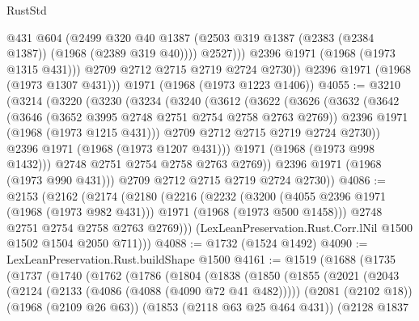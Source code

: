 \begin{lexlean}{RustStd}
\begin{coremodule}
{\begin{coremodule}
{{{{{                  @431
                  @604
                  (@2499
                    @320
                    @40
                    @1387
                    (@2503 @319 @1387 (@2383 (@2384 @1387)) (@1968 (@2389 @319 @40))))
                  @2527)))
            @2396
            @1971
            (@1968 (@1973 @1315 @431)))
          @2709
          @2712
          @2715
          @2719
          @2724
          @2730))
      @2396
      @1971
      (@1968 (@1973 @1307 @431)))
    @1971
    (@1968 (@1973 @1223 @1406))
@4055 := @3210
    (@3214
      (@3220
        (@3230
          (@3234
            (@3240
              (@3612
                (@3622
                  (@3626
                    (@3632
                      (@3642
                        (@3646 (@3652 @3995 @2748 @2751 @2754 @2758 @2763 @2769))
                        @2396
                        @1971
                        (@1968 (@1973 @1215 @431)))
                      @2709
                      @2712
                      @2715
                      @2719
                      @2724
                      @2730))
                  @2396
                  @1971
                  (@1968 (@1973 @1207 @431)))
                @1971
                (@1968 (@1973 @998 @1432)))
              @2748
              @2751
              @2754
              @2758
              @2763
              @2769))
          @2396
          @1971
          (@1968 (@1973 @990 @431)))
        @2709
        @2712
        @2715
        @2719
        @2724
        @2730))
@4086 := @2153
    (@2162
      (@2174
        (@2180
          (@2216
            (@2232
              (@3200 (@4055 @2396 @1971 (@1968 (@1973 @982 @431))) @1971 (@1968 (@1973 @500 @1458)))
              @2748
              @2751
              @2754
              @2758
              @2763
              @2769)))
        (LexLeanPreservation.Rust.Corr.lNil @1500 @1502 @1504 @2050 @711)))
@4088 := @1732 (@1524 @1492)
@4090 := LexLeanPreservation.Rust.buildShape @1500
@4161 := @1519
    (@1688
      (@1735
        (@1737
          (@1740
            (@1762
              (@1786
                (@1804
                  (@1838
                    (@1850
                      (@1855
                        (@2021
                          (@2043
                            (@2124 (@2133 (@4086 (@4088 (@4090 @72 @41 @482)))))
                            (@2081 (@2102 @18))
                            (@1968 (@2109 @26 @63))
                            (@1853 (@2118 @63 @25 @464 @431))
                            (@2128
                              @1837
}}}}}
\end{coremodule}}
\end{coremodule}
\end{lexlean}

